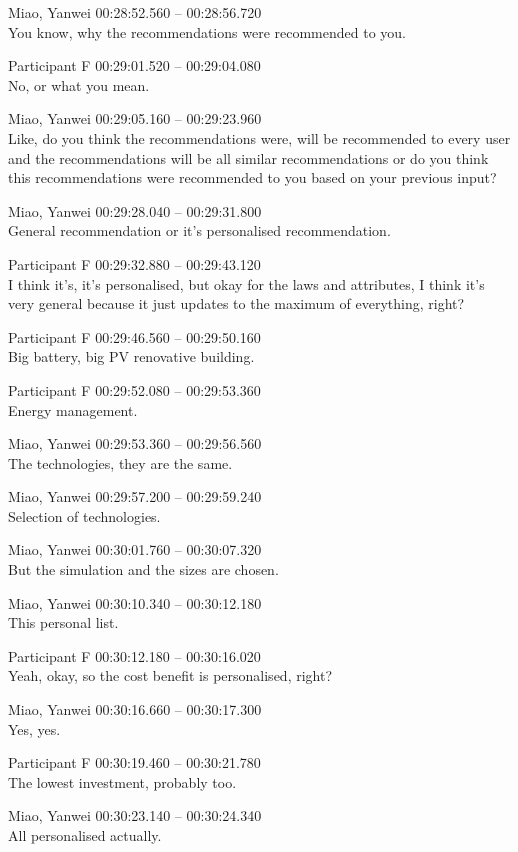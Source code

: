 {Miao, Yanwei 00:28:52.560 -- 00:28:56.720 \\
You know, why the recommendations were recommended to you.

Participant F 00:29:01.520 -- 00:29:04.080 \\
No, or what you mean.

Miao, Yanwei 00:29:05.160 -- 00:29:23.960 \\
Like, do you think the recommendations were, will be recommended to every user and the recommendations will be all similar recommendations or do you think this recommendations were recommended to you based on your previous input?

Miao, Yanwei 00:29:28.040 -- 00:29:31.800 \\
General recommendation or it's personalised recommendation.

Participant F 00:29:32.880 -- 00:29:43.120 \\
I think it's, it's personalised, but okay for the laws and attributes, I think it's very general because it just updates to the maximum of everything, right?

Participant F 00:29:46.560 -- 00:29:50.160 \\
Big battery, big PV renovative building.

Participant F 00:29:52.080 -- 00:29:53.360 \\
Energy management.

Miao, Yanwei 00:29:53.360 -- 00:29:56.560 \\
The technologies, they are the same.

Miao, Yanwei 00:29:57.200 -- 00:29:59.240 \\
Selection of technologies.

Miao, Yanwei 00:30:01.760 -- 00:30:07.320 \\
But the simulation and the sizes are chosen.

Miao, Yanwei 00:30:10.340 -- 00:30:12.180 \\
This personal list.

Participant F 00:30:12.180 -- 00:30:16.020 \\
Yeah, okay, so the cost benefit is personalised, right?

Miao, Yanwei 00:30:16.660 -- 00:30:17.300 \\
Yes, yes.

Participant F 00:30:19.460 -- 00:30:21.780 \\
The lowest investment, probably too.

Miao, Yanwei 00:30:23.140 -- 00:30:24.340 \\
All personalised actually.

}
